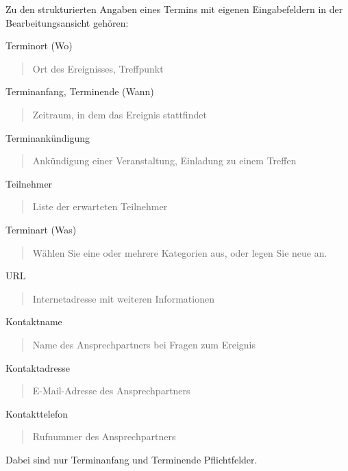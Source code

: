 \documentclass[a4paper,12pt,ngerman]{manual}
\begin{document}
Zu den strukturierten Angaben eines Termins mit eigenen Eingabefeldern in der
Bearbeitungsansicht gehören:

Terminort (Wo)
\begin{quote}

Ort des Ereignisses, Treffpunkt
\end{quote}

Terminanfang, Terminende (Wann)
\begin{quote}

Zeitraum, in dem das Ereignis stattfindet
\end{quote}

Terminankündigung
\begin{quote}

Ankündigung einer Veranstaltung, Einladung zu einem Treffen
\end{quote}

Teilnehmer
\begin{quote}

Liste der erwarteten Teilnehmer
\end{quote}

Terminart (Was)
\begin{quote}

Wählen Sie eine oder mehrere Kategorien aus, oder legen
Sie neue an.
\end{quote}

URL
\begin{quote}

Internetadresse mit weiteren Informationen
\end{quote}

Kontaktname
\begin{quote}

Name des Ansprechpartners bei Fragen zum Ereignis
\end{quote}

Kontaktadresse
\begin{quote}

E-Mail-Adresse des Ansprechpartners
\end{quote}

Kontakttelefon
\begin{quote}

Rufnummer des Ansprechpartners
\end{quote}

Dabei sind nur Terminanfang und Terminende Pflichtfelder.
\end{document}
